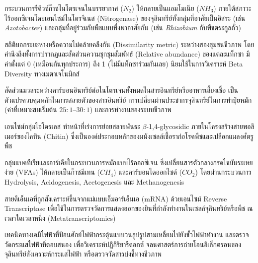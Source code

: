 \begin{description}[leftmargin=1.8cm, style=nextline, font=\bfseries\color{agriGreen}]
\item[Biological Nitrogen Fixation (BNF)]
กระบวนการรีดิวซ์ก๊าซไนโตรเจนในบรรยากาศ ($N_2$) ให้กลายเป็นแอมโมเนีย ($NH_3$) ภายใต้สภาวะไร้ออกซิเจนโดยเอนไซม์ไนโตรจีเนส (Nitrogenase) ของจุลินทรีย์ทั้งกลุ่มที่อาศัยเป็นอิสระ (เช่น \textit{Azotobacter}) และกลุ่มที่อยู่ร่วมกับพืชแบบพึ่งพาอาศัยกัน (เช่น \textit{Rhizobium} กับพืชตระกูลถั่ว)

\item[Bray-Curtis Dissimilarity]
สถิติบอกระยะห่างหรือความไม่คล้ายคลึงกัน (Dissimilarity metric) ระหว่างสองชุมชนชีวภาพ โดยคำนึงถึงทั้งการปรากฏและสัดส่วนความชุกชุมสัมพัทธ์ (Relative abundance) ของแต่ละแท็กซา มีค่าตั้งแต่ 0 (เหมือนกันทุกประการ) ถึง 1 (ไม่มีแท็กซาร่วมกันเลย) นิยมใช้ในการวิเคราะห์ Beta Diversity ทางเมตาเจโนมิกส์

\item[Carbon-to-Nitrogen Ratio (C:N Ratio)]
สัดส่วนมวลระหว่างคาร์บอนอินทรีย์ต่อไนโตรเจนทั้งหมดในสารอินทรีย์หรืออาหารเลี้ยงเชื้อ เป็นตัวแปรควบคุมหลักในการสลายตัวของสารอินทรีย์ การเปลี่ยนผ่านประชากรจุลินทรีย์ในการทำปุ๋ยหมัก (ค่าที่เหมาะสมเริ่มต้น $25:1$--$30:1$) และการทำงานของระบบชีวภาพ

\item[Chitinase]
เอนไซม์กลุ่มไฮโดรเลส ทำหน้าที่เร่งการย่อยสลายพันธะ $\beta$-1,4-glycosidic ภายในโครงสร้างสายพอลิเมอร์ของไคทิน (Chitin) ซึ่งเป็นองค์ประกอบหลักของผนังเซลล์เชื้อราก่อโรคพืชและเปลือกแมลงศัตรูพืช

\item[Clostridium Group / Methanogenesis Pathway]
กลุ่มแบคทีเรียและอาร์เคียในกระบวนการหมักแบบไร้ออกซิเจน ซึ่งเปลี่ยนสารตัวกลางกรดไขมันระเหยง่าย (VFAs) ให้กลายเป็นก๊าซมีเทน ($CH_4$) และคาร์บอนไดออกไซด์ ($CO_2$) โดยผ่านกระบวนการ Hydrolysis, Acidogenesis, Acetogenesis และ Methanogenesis

\item[Complementary DNA (cDNA)]
สายดีเอ็นเอที่ถูกสังเคราะห์ขึ้นจากแม่แบบเอ็มอาร์เอ็นเอ (mRNA) ด้วยเอนไซม์ Reverse Transcriptase เพื่อใช้ในการตรวจวัดการแสดงออกของยีนที่กำลังทำงานในเซลล์จุลินทรีย์หรือพืช ณ เวลาใดเวลาหนึ่ง (Metatranscriptomics)

\item[Cyclic Voltammetry (CV)]
เทคนิคทางเคมีไฟฟ้าที่ป้อนศักย์ไฟฟ้ากระตุ้นแบบวนลูปรูปสามเหลี่ยมไปยังขั้วไฟฟ้าทำงาน และตรวจวัดกระแสไฟฟ้าที่ตอบสนอง เพื่อวิเคราะห์ปฏิกิริยารีดอกซ์ จลนศาสตร์การถ่ายโอนอิเล็กตรอนของจุลินทรีย์สังเคราะห์กระแสไฟฟ้า หรือตรวจวัดสารบ่งชี้ทางชีวภาพ


\end{description}
